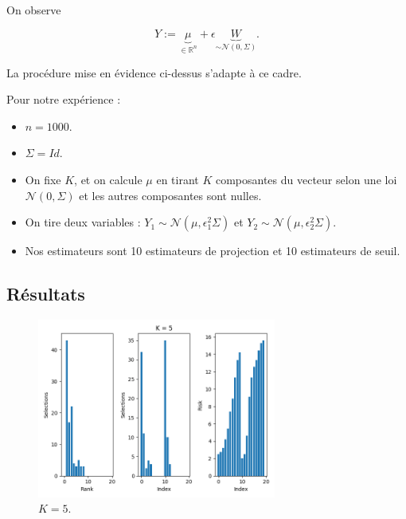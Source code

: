 \documentclass[11pt,letterpaper]{article}
\begin{document}
\par On observe

\begin{equation}
Y := \underbrace{\mu}_{\in \mathbb{R}^n} + \epsilon \underbrace{W}_{\sim \mathcal{N} \left( 0, \Sigma \right)} .
\end{equation}

\par La procédure mise en évidence ci-dessus s'adapte à ce cadre.

\par Pour notre expérience : 
\begin{itemize}
\item $n = 1000$.
\item $\Sigma = Id$.
\item On fixe $K$, et on calcule $\mu$ en tirant $K$ composantes du vecteur selon une loi $\mathcal{N} \left( 0, \Sigma \right)$ et les autres composantes sont nulles.
\item On tire deux variables : $Y_1 \sim \mathcal{N} \left( \mu, \epsilon_1^2 \Sigma \right)$ et $Y_2 \sim \mathcal{N} \left( \mu, \epsilon_2^2 \Sigma \right)$.
\item Nos estimateurs sont 10 estimateurs de projection et 10 estimateurs de seuil.
\end{itemize}

\subsection{Résultats}

\begin{figure}[H]
  \centering
    \includegraphics[width=0.7\textwidth]{images/K=5.png}
  \caption{$K = 5$.}
\end{figure}
\end{document}
